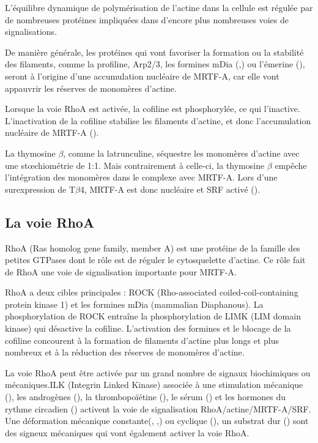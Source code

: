 \documentclass{report}
\begin{document}
L'équilibre dynamique de polymérisation de l'actine dans la cellule est régulée par de nombreuses protéines impliquées dans d'encore plus nombreuses voies de signalisations. 

De manière générale, les protéines qui vont favoriser la formation ou la stabilité des filaments, comme la profiline, Arp2/3, les formines mDia (\cite{chan_force-induced_2010},\cite{baarlink_nuclear_2013}) ou l'émerine (\cite{ho_lamin_2013}), seront à l'origine d'une accumulation nucléaire de MRTF-A, car elle vont appauvrir les réserves de monomères d'actine. 

Lorsque la voie RhoA est activée, la cofiline est phosphorylée, ce qui l'inactive. L'inactivation de la cofiline stabilise les filaments d'actine, et donc l'accumulation nucléaire de MRTF-A (\cite{zhao_force_2007}). 

La thymosine $\beta$, comme la latrunculine, séquestre les monomères d'actine avec une st\oe chiométrie de 1:1. Mais contrairement à celle-ci, la thymosine $\beta$ empêche l'intégration des monomères dans le complexe avec MRTF-A. Lors d'une surexpression de T$\beta$4, MRTF-A est donc nucléaire et SRF activé (\cite{morita_g-actin_2013}).




\subsection{La voie RhoA}

RhoA (Ras homolog gene family, member A) est une protéine de la famille des petites GTPases dont le rôle est de réguler le cytosquelette d'actine. Ce rôle fait de RhoA une voie de signalisation importante pour MRTF-A. 

RhoA a deux cibles principales : ROCK (Rho-associated coiled-coil-containing protein kinase 1) et les formines mDia (mammalian Diaphanous). La phosphorylation de ROCK entraîne la phosphorylation de LIMK (LIM domain kinase) qui désactive la cofiline. L'activation des formines et le blocage de la cofiline concourent à la formation de filaments d'actine plus longs et plus nombreux et à la réduction des réserves de monomères d'actine. 

La voie RhoA peut être activée par un grand nombre de signaux biochimiques ou mécaniques.ILK (Integrin Linked Kinase) associée à une stimulation mécanique (\cite{maier_tenascin-c_2008}), les androgènes (\cite{schmidt_rhoa_2012}), la thrombopoïétine (\cite{smith_induction_2013}), le sérum (\cite{sotiropoulos_signal-regulated_1999}) et les hormones du rythme circadien (\cite{gerber_blood-borne_2013}) activent la voie de signalisation RhoA/actine/MRTF-A/SRF. 
Une déformation mécanique constante(\cite{albinsson_stretch_2004}, \cite{zhao_force_2007},\cite{chan_force-induced_2010}) ou cyclique (\cite{kuwahara_myocardin-related_2010}), un substrat dur (\cite{huang_matrix_2012}) sont des signeux mécaniques qui vont également activer la voie RhoA. 
\end{document}
